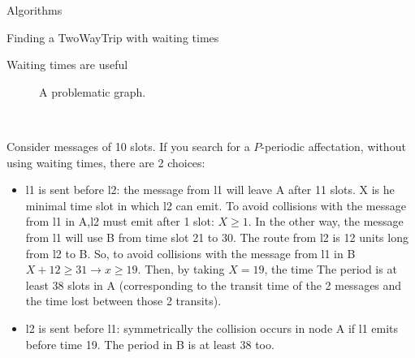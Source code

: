 \documentclass[a4paper,10pt]{report}
\begin{document}
\begin{chapter}{Algorithms}
\begin{section}{Finding a TwoWayTrip with waiting times}
\begin{subsection}{Waiting times are useful}
\begin{center}
{{\begin{figure}[H]
\begin{center}
{
  }
  \caption{A problematic graph.}
 
\end{center}
\end{figure}
}}\\
\end{center}


Consider messages of 10 slots. If you search for a $P$-periodic affectation, without using waiting times, there are 2 choices: 
\begin{itemize}
 \item l1 is sent before l2: the message from l1 will leave A after 11 slots. X is he minimal time slot in which l2 can emit. 
 To avoid collisions with the message from l1 in A,l2 must emit after 1 slot:  $X\ge1$.
 In the other way, the message from l1 will use B from time slot 21 to 30. The route from l2 is 12 units long from l2 to B. So, to avoid collisions with 
 the message from l1 in B $X+12 \ge 31 \rightarrow x\ge 19$. Then, by taking $X=19$, the time
 The period is at least 38 slots in A (corresponding to the transit time of the 2 messages and the time lost between those 2 transits).
 \item l2 is sent before l1: symmetrically the collision occurs in node A if l1 emits before time 19. The period in B is at least 38 too.
\end{itemize}


\begin{center}
\end{center}
\end{subsection}
\end{section}
\end{chapter}
\end{document}
